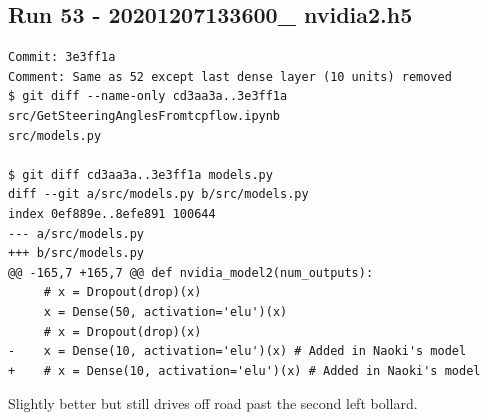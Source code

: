 \subsection{Run 53 - 20201207133600\_ nvidia2.h5 }
\begin{verbatim}
Commit: 3e3ff1a
Comment: Same as 52 except last dense layer (10 units) removed
$ git diff --name-only cd3aa3a..3e3ff1a
src/GetSteeringAnglesFromtcpflow.ipynb
src/models.py

$ git diff cd3aa3a..3e3ff1a models.py
diff --git a/src/models.py b/src/models.py
index 0ef889e..8efe891 100644
--- a/src/models.py
+++ b/src/models.py
@@ -165,7 +165,7 @@ def nvidia_model2(num_outputs):
     # x = Dropout(drop)(x)
     x = Dense(50, activation='elu')(x)
     # x = Dropout(drop)(x)
-    x = Dense(10, activation='elu')(x) # Added in Naoki's model
+    # x = Dense(10, activation='elu')(x) # Added in Naoki's model

\end{verbatim}

Slightly better but still drives off road past the second left bollard.

